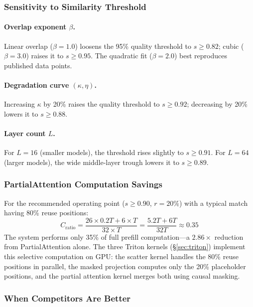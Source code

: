 \documentclass[11pt,twocolumn]{article}
\begin{document}
\subsubsection{Sensitivity to Similarity Threshold}

\paragraph{Overlap exponent $\beta$.} Linear overlap ($\beta{=}1.0$)
loosens the 95\% quality threshold to $s{\geq}0.82$; cubic
($\beta{=}3.0$) raises it to $s{\geq}0.95$. The quadratic fit
($\beta{=}2.0$) best reproduces published data points.

\paragraph{Degradation curve $(\kappa, \eta)$.} Increasing $\kappa$ by
20\% raises the quality threshold to $s{\geq}0.92$; decreasing by 20\%
lowers it to $s{\geq}0.88$.

\paragraph{Layer count $L$.} For $L{=}16$ (smaller models), the
threshold rises slightly to $s{\geq}0.91$. For $L{=}64$ (larger
models), the wide middle-layer trough lowers it to $s{\geq}0.89$.

\subsubsection{PartialAttention Computation Savings}

For the recommended operating point ($s{\geq}0.90$, $r{=}20\%$) with a
typical match having 80\% reuse positions:
\begin{equation}
  C_\text{ratio} = \frac{26 \times 0.2T + 6 \times T}{32 \times T} = \frac{5.2T + 6T}{32T} \approx 0.35
  \label{eq:savings}
\end{equation}
The system performs only 35\% of full prefill computation---a
$2.86\times$ reduction from PartialAttention alone. The three Triton
kernels (\S\ref{sec:triton}) implement this selective computation on GPU:
the scatter kernel handles the 80\% reuse positions in parallel, the
masked projection computes only the 20\% placeholder positions, and
the partial attention kernel merges both using causal masking.

\subsubsection{When Competitors Are Better}
\end{document}
